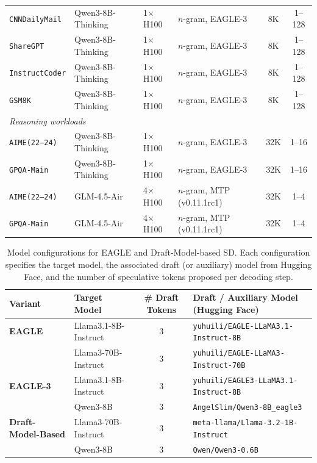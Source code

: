 \begin{table}[t!]
\begin{tabular}{l l l l c c}
\texttt{CNNDailyMail} & Qwen3-8B-Thinking    & 1$\times$H100 & $n$-gram, EAGLE-3         & 8K  & 1–128 \\
\texttt{ShareGPT}     & Qwen3-8B-Thinking    & 1$\times$H100 & $n$-gram, EAGLE-3      & 8K  & 1–128 \\
\texttt{InstructCoder}& Qwen3-8B-Thinking    & 1$\times$H100 & $n$-gram, EAGLE-3    & 8K  & 1–128 \\
\texttt{GSM8K}        & Qwen3-8B-Thinking    & 1$\times$H100 & $n$-gram, EAGLE-3    & 8K  & 1–128 \\
\midrule
\multicolumn{6}{l}{\textit{Reasoning workloads}} \\
\texttt{AIME(22--24)} & Qwen3-8B-Thinking    & 1$\times$H100 & $n$-gram, EAGLE-3       & 32K & 1–16 \\
\texttt{GPQA-Main}    & Qwen3-8B-Thinking    & 1$\times$H100 & $n$-gram, EAGLE-3       & 32K & 1–16 \\
\texttt{AIME(22--24)} & GLM-4.5-Air    & 4$\times$H100 & $n$-gram, MTP (v0.11.1rc1)       & 32K & 1–4 \\
\texttt{GPQA-Main}    & GLM-4.5-Air     & 4$\times$H100 & $n$-gram, MTP (v0.11.1rc1)      & 32K & 1–4 \\
\bottomrule
\end{tabular}
\end{table}

\begin{table}[t]
\centering
\caption{
Model configurations for EAGLE and Draft-Model-based SD.
Each configuration specifies the target model, the associated draft (or auxiliary) model from Hugging Face,
and the number of speculative tokens proposed per decoding step.}
\label{appendix:model-config}
\begin{tabular}{l l c l}
\toprule
\textbf{Variant} & \textbf{Target Model} & \textbf{\# Draft Tokens} & \textbf{Draft / Auxiliary Model (Hugging Face)} \\
\midrule
\textbf{EAGLE} 
& Llama3.1-8B-Instruct & 3 & \texttt{yuhuili/EAGLE-LLaMA3.1-Instruct-8B} \\
& Llama3-70B-Instruct  & 3 & \texttt{yuhuili/EAGLE-LLaMA3-Instruct-70B} \\
\midrule
\textbf{EAGLE-3} 
& Llama3.1-8B-Instruct & 3 & \texttt{yuhuili/EAGLE3-LLaMA3.1-Instruct-8B} \\
& Qwen3-8B             & 3 & \texttt{AngelSlim/Qwen3-8B\_eagle3} \\
\midrule
\textbf{Draft-Model-Based} 
& Llama3-70B-Instruct  & 3 & \texttt{meta-llama/Llama-3.2-1B-Instruct} \\
& Qwen3-8B             & 3 & \texttt{Qwen/Qwen3-0.6B} \\
\bottomrule
\end{tabular}
\end{table}
\pagebreak


